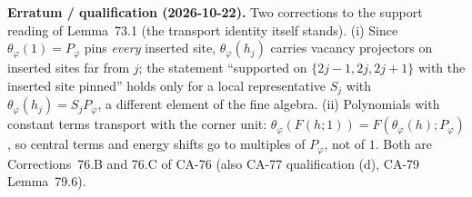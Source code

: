 \textbf{Erratum / qualification (2026-10-22).}  Two corrections to the
support reading of Lemma~73.1 (the transport identity itself stands).
(i) Since \(\theta_\varphi(1)=P_\varphi\) pins \emph{every} inserted site,
\(\theta_\varphi(h_j)\) carries vacancy projectors on inserted sites far
from \(j\); the statement ``supported on \(\{2j-1,2j,2j+1\}\) with the
inserted site pinned'' holds only for a local representative \(S_j\) with
\(\theta_\varphi(h_j)=S_jP_\varphi\), a different element of the fine
algebra.  (ii) Polynomials with constant terms transport with the corner
unit: \(\theta_\varphi(F(h;1))=F(\theta_\varphi(h);P_\varphi)\), so central
terms and energy shifts go to multiples of \(P_\varphi\), not of \(1\).
Both are Corrections~76.B and 76.C of CA-76 (also CA-77 qualification (d),
CA-79 Lemma~79.6).
